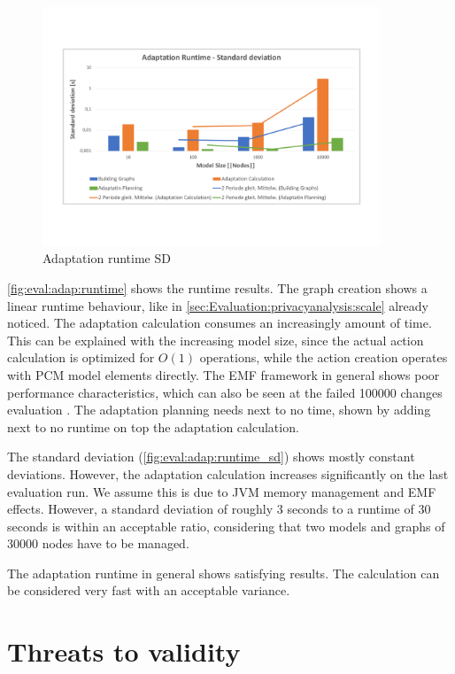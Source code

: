 \begin{figure}[h]
	\centering
	\includegraphics[trim = 10mm 30mm 10mm 20mm, clip, width=0.90\textwidth]{graphs/Runtime_adapt_sd}
	\caption{Adaptation runtime SD}
	\label{fig:eval:adap:runtime_sd}
\end{figure}

\autoref{fig:eval:adap:runtime} shows the runtime results. The graph creation shows a linear runtime behaviour, like in \autoref{sec:Evaluation:privacyanalysis:scale} already noticed. The adaptation calculation consumes an increasingly amount of time. This can be explained with the increasing model size, since the actual action calculation is optimized for $O(1)$ operations, while the action creation operates with PCM model elements directly. The EMF framework in general shows poor performance characteristics, which can also be seen at the failed 100000 changes evaluation \cite{eclipse.org.2009}\cite{Steinberg.20050706}. The adaptation planning needs next to no time, shown by adding next to no runtime on top the adaptation calculation.

The standard deviation (\autoref{fig:eval:adap:runtime_sd}) shows mostly constant deviations. However, the adaptation calculation increases significantly on the last evaluation run. We assume this is due to JVM memory management and EMF effects. However, a standard deviation of roughly 3 seconds to a runtime of 30 seconds is within an acceptable ratio, considering that two models and graphs of 30000 nodes have to be managed.

The adaptation runtime in general shows satisfying results. The calculation can be considered very fast with an acceptable variance.


\section{Threats to validity}
\label{sec:eval:threats}

